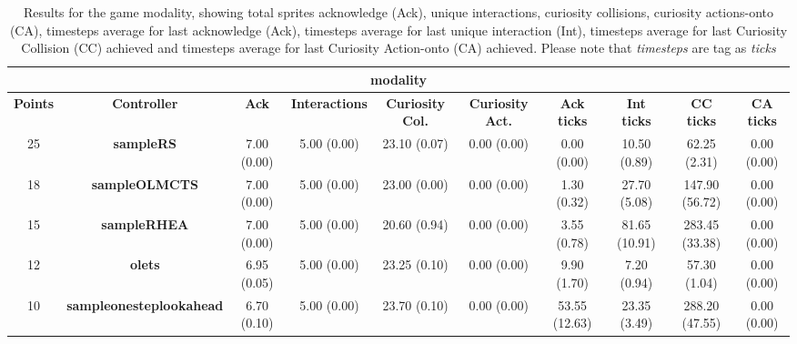 \begin{table*}[!t]
\begin{center}
\begin{adjustbox}{width=1\textwidth}
\begin{tabular}{|c|c|c|c|c|c|c|c|c|c|}
\multicolumn{10}{c}{\textbf{modality}}\\
\hline
\textbf{Points} & \textbf{Controller} & \textbf{Ack} & \textbf{Interactions} & \textbf{Curiosity Col.} & \textbf{Curiosity Act.} & \textbf{Ack ticks} & \textbf{Int ticks} & \textbf{CC ticks} & \textbf{CA ticks}\\
\hline
25 & \textbf{sampleRS} & 7.00 (0.00) & 5.00 (0.00) & 23.10 (0.07) & 0.00 (0.00) & 0.00 (0.00) & 10.50 (0.89) & 62.25 (2.31) & 0.00 (0.00)
 \\
\hline
18 & \textbf{sampleOLMCTS} & 7.00 (0.00) & 5.00 (0.00) & 23.00 (0.00) & 0.00 (0.00) & 1.30 (0.32) & 27.70 (5.08) & 147.90 (56.72) & 0.00 (0.00)
 \\
\hline
15 & \textbf{sampleRHEA} & 7.00 (0.00) & 5.00 (0.00) & 20.60 (0.94) & 0.00 (0.00) & 3.55 (0.78) & 81.65 (10.91) & 283.45 (33.38) & 0.00 (0.00)
 \\
\hline
12 & \textbf{olets} & 6.95 (0.05) & 5.00 (0.00) & 23.25 (0.10) & 0.00 (0.00) & 9.90 (1.70) & 7.20 (0.94) & 57.30 (1.04) & 0.00 (0.00)
 \\
\hline
10 & \textbf{sampleonesteplookahead} & 6.70 (0.10) & 5.00 (0.00) & 23.70 (0.10) & 0.00 (0.00) & 53.55 (12.63) & 23.35 (3.49) & 288.20 (47.55) & 0.00 (0.00)
 \\
\hline
\end{tabular}
\end{adjustbox}
\caption{Results for the game modality, showing total sprites acknowledge (Ack), unique interactions, curiosity collisions, curiosity actions-onto (CA), timesteps average for last acknowledge (Ack),  timesteps average for last unique interaction (Int), timesteps average for last Curiosity Collision (CC) achieved and timesteps average for last Curiosity Action-onto (CA) achieved. Please note that \textit{timesteps} are tag as \textit{ticks}}
\label{tab:weights}
\end{center}
\end{table*}
